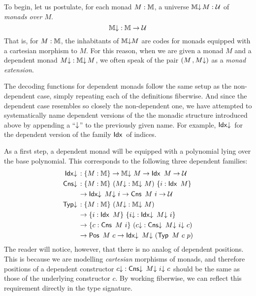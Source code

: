 To begin, let us postulate, for each monad $M : \mathbb{M}$, a universe
$\mathbb{M{\downarrow}}\, M : \mathcal{U}$ of \emph{monads over $M$}.  
\[
  \mathbb{M}{\downarrow} : \mathbb{M} \rightarrow \mathcal{U}
\]
That is, for $M : \mathbb{M}$, the inhabitants of $\mathbb{M{\downarrow}} M$ are codes for
monads equipped with a cartesian morphism to $M$.  For this reason,
when we are given a monad $M$ and a dependent monad $M{\downarrow} : \mathbb{M{\downarrow}}\, M$,
we often speak of the pair $(M \,, M{\downarrow})$ as a \emph{monad extension}.

The decoding functions for dependent monads follow the same setup as
the non-dependent case, simply repeating each of the definitions
fiberwise.  And since the dependent case resembles so closely the
non-dependent one, we have attempted to systematically name dependent
versions of the the monadic structure introduced above by
appending a ``${\downarrow}$'' to the previously given name.  For example,
$\mathsf{Idx}{\downarrow}\,$ for the dependent version of the family $\mathsf{Idx}\,$ of indices.

As a first step, a dependent monad will be equipped with a polynomial
lying over the base polynomial.  This corresponds to the following
three dependent families:
\begin{align*}
  \mathsf{Idx}{\downarrow}\, &: \{M : \mathbb{M}\} \to \mathbb{M{\downarrow}}\ M \to \mathsf{Idx}\,\ M \to \mathcal{U}\\
  \mathsf{Cns}{\downarrow}\, &: \{M : \mathbb{M}\}\ (M{\downarrow} : \mathbb{M{\downarrow}}\ M)\ \{i : \mathsf{Idx}\,\ M\}\\ 
        &\to \mathsf{Idx}{\downarrow}\,\ M{\downarrow}\ i \to \mathsf{Cns}\,\ M\ i \to \mathcal{U}\\
  \mathsf{Typ}{\downarrow}\, &: \{M : \mathbb{M}\}\ (M{\downarrow} : \mathbb{M{\downarrow}}\ M)\\
        &\to \{i : \mathsf{Idx}\,\ M\}\ \{i{\downarrow} : \mathsf{Idx}{\downarrow}\,\ M{\downarrow}\ i\}\\
        &\to \{c : \mathsf{Cns}\,\ M\ i\}\ (c{\downarrow} : \mathsf{Cns}{\downarrow}\,\ M{\downarrow}\ i{\downarrow}\ c)\\
        &\to \mathsf{Pos}\,\ M\ c \to \mathsf{Idx}{\downarrow}\,\ M{\downarrow}\ (\mathsf{Typ}\,\ M\ c\ p)
\end{align*}
The reader will notice, however, that there is no analog of dependent
positions.  This is because we are modelling \emph{cartesian}
morphisms of monads, and therefore positions of a dependent
constructor $c\da : \Cnsd\ M\da\ i\da\ c$ should be the same as those
of the underlying constructor $c$.  By working fiberwise, we can
reflect this requirement directly in the type signature.

